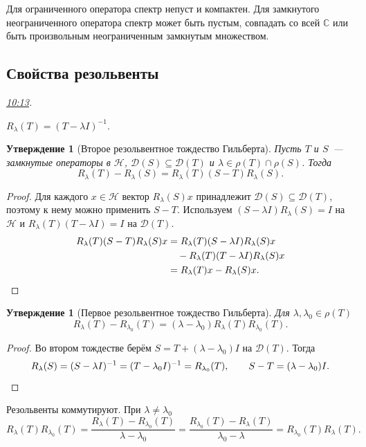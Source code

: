 \documentclass[11pt,a4paper]{article}
\theoremstyle{plain}
\newtheorem{proposition}[theorem]{Утверждение}
\theoremstyle{definition}
\newcommand{\CC}{\mathbb C}
\newcommand{\Hh}{\mathcal H}
\newcommand{\Dom}{\mathcal D}
\newcommand{\id}{I}
\newcommand{\at}[3]{\href{https://www.youtube.com/watch?v=#1&t=#2s}{#3}}
\newcommand{\topic}[2]{\Needspace{5\baselineskip}\subsection*{#1}\noindent\emph{#2.}\par\nobreak\smallskip}
\begin{document}
Для ограниченного оператора спектр непуст и компактен.
Для замкнутого неограниченного оператора спектр может быть
пустым, совпадать со всей $\CC$ или быть произвольным
неограниченным замкнутым множеством.

\topic{Свойства резольвенты}{\at{pe5XWL9wtg4}{613}{10:13}}
$R_\lambda(T)=(T-\lambda\id)^{-1}$.
\begin{proposition}[Второе резольвентное тождество Гильберта]
Пусть $T$ и $S$~--- замкнутые операторы в $\Hh$,
$\Dom(S)\subseteq\Dom(T)$ и
$\lambda\in\rho(T)\cap\rho(S)$. Тогда
\[
 R_\lambda(T)-R_\lambda(S)=R_\lambda(T)(S-T)R_\lambda(S).
\]
\end{proposition}
\begin{proof}
Для каждого $x\in\Hh$ вектор $R_\lambda(S)x$
принадлежит $\Dom(S)\subseteq\Dom(T)$, поэтому к нему
можно применить $S-T$. Используем
$(S-\lambda\id)R_\lambda(S)=\id$ на $\Hh$ и
$R_\lambda(T)(T-\lambda\id)=\id$ на $\Dom(T)$.
\[
 \begin{aligned}
 R_\lambda(T)(S-T)R_\lambda(S)x
 &=R_\lambda(T)(S-\lambda\id)R_\lambda(S)x\\
 &\quad-R_\lambda(T)(T-\lambda\id)R_\lambda(S)x\\
 &=R_\lambda(T)x-R_\lambda(S)x.
 \end{aligned}\qedhere
\]
\end{proof}

\begin{proposition}[Первое резольвентное тождество Гильберта]
Для $\lambda,\lambda_0\in\rho(T)$
\[
 R_\lambda(T)-R_{\lambda_0}(T)
 =(\lambda-\lambda_0)R_\lambda(T)R_{\lambda_0}(T).
\]
\end{proposition}
\begin{proof}
Во втором тождестве берём $S=T+(\lambda-\lambda_0)\id$
на $\Dom(T)$. Тогда
\[
 R_\lambda(S)=(S-\lambda\id)^{-1}
 =(T-\lambda_0\id)^{-1}=R_{\lambda_0}(T),\qquad
 S-T=(\lambda-\lambda_0)\id.\qedhere
\]
\end{proof}
Резольвенты коммутируют. При $\lambda\ne\lambda_0$
\[
 R_\lambda(T)R_{\lambda_0}(T)
 =\frac{R_\lambda(T)-R_{\lambda_0}(T)}{\lambda-\lambda_0}
 =\frac{R_{\lambda_0}(T)-R_\lambda(T)}{\lambda_0-\lambda}
 =R_{\lambda_0}(T)R_\lambda(T).
\]
\end{document}
